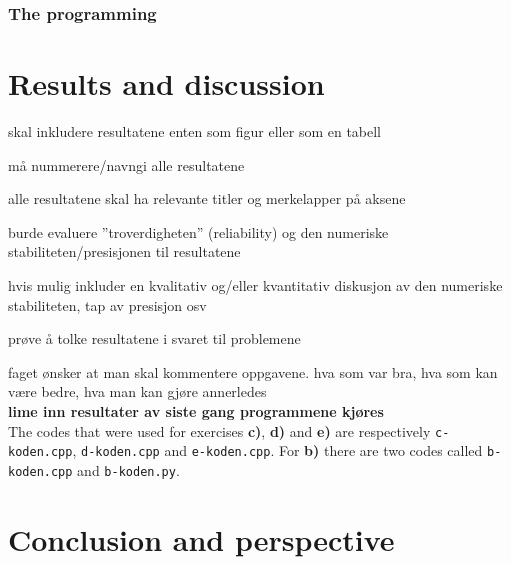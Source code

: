 \documentclass{article}
\begin{document}
  \subsubsection{The programming}








\vspace{1cm}

\section{Results and discussion}

  skal inkludere resultatene enten som figur eller som en tabell

  må nummerere/navngi alle resultatene

  alle resultatene skal ha relevante titler og merkelapper på aksene

  burde evaluere ''troverdigheten'' (reliability) og den numeriske stabiliteten/presisjonen til resultatene

  hvis mulig inkluder en kvalitativ og/eller kvantitativ diskusjon av den numeriske stabiliteten, tap av presisjon osv

  prøve å tolke resultatene i svaret til problemene

  faget ønsker at man skal kommentere oppgavene. hva som var bra, hva som kan være bedre, hva man kan gjøre annerledes \\

  {\bf lime inn resultater av siste gang programmene kjøres} \\


  The codes that were used for exercises \textbf{c)}, \textbf{d)} and \textbf{e)} are respectively \texttt{c-koden.cpp}, \texttt{d-koden.cpp} and \texttt{e-koden.cpp}. For \textbf{b)} there are two codes called \texttt{b-koden.cpp} and \texttt{b-koden.py}.




\vspace{1cm}

\section{Conclusion and perspective}
\end{document}
